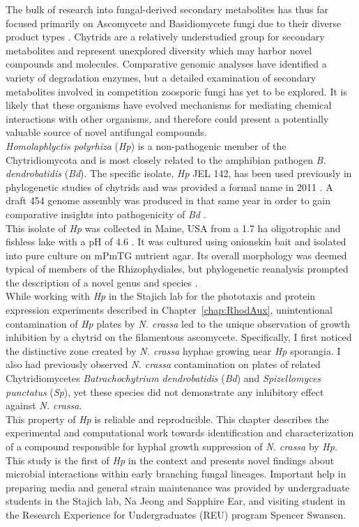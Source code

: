 \indent The bulk of research into fungal-derived secondary metabolites has thus far focused primarily on Ascomycete and Basidiomycete fungi due to their diverse product types \cite{Berdy2012}. Chytrids are a relatively understudied group for secondary metabolites and represent unexplored diversity which may harbor novel compounds and molecules. Comparative genomic analyses have identified a variety of degradation enzymes, but a detailed examination of secondary metabolites involved in competition zoosporic fungi has yet to be explored. It is likely that these organisms have evolved mechanisms for mediating chemical interactions with other organisms, and therefore could present a potentially valuable source of novel antifungal compounds.\\
\indent \textit{Homolaphlyctis polyrhiza} (\textit{Hp}) is a non-pathogenic member of the Chytridiomycota and is most closely related to the amphibian pathogen \textit{B. dendrobatidis} (\textit{Bd}). The specific isolate, \textit{Hp} JEL 142, has been used previously in phylogenetic studies of chytrids \cite{James2000,James2006sixGene,Letcher2008} and was provided a formal name in 2011 \cite{Longcore2011}. A draft 454 genome assembly was produced in that same year in order to gain comparative insights into pathogenicity of \textit{Bd} \cite{Joneson2011}.\\
\indent This isolate of \textit{Hp} was collected in Maine, USA from a 1.7 ha oligotrophic and fishless lake with a pH of 4.6 \cite{Davis1994,Rhodes1995}. It was cultured using onionskin bait and isolated into pure culture on mPmTG nutrient agar. Its overall morphology was deemed typical of members of the Rhizophydiales, but phylogenetic reanalysis prompted the description of a novel genus and species \cite{Longcore2011}.\\
\indent While working with \textit{Hp} in the Stajich lab for the phototaxis and protein expression experiments described in Chapter~\ref{chap:RhodAux}, unintentional contamination of \textit{Hp} plates by \textit{N. crassa} led to the unique observation of growth inhibition by a chytrid on the filamentous ascomycete. Specifically, I first noticed the distinctive zone created by \textit{N. crassa} hyphae growing near \textit{Hp} sporangia. I also had previously observed \textit{N. crassa} contamination on plates of related Chytridiomycetes \textit{Batrachochytrium dendrobatidis} (\textit{Bd}) and \textit{Spizellomyces punctatus} (\textit{Sp}), yet these species did not demonstrate any inhibitory effect against \textit{N. crassa}.\\
\indent This property of \textit{Hp} is reliable and reproducible. This chapter describes the experimental and computational work towards identification and characterization of a compound responsible for hyphal growth suppression of \textit{N. crassa} by \textit{Hp}. This study is the first of \textit{Hp} in the context and presents novel findings about microbial interactions within early branching fungal lineages. Important help in preparing media and general strain maintenance was provided by undergraduate students in the Stajich lab, Na Jeong and Sapphire Ear, and visiting student in the Research Experience for Undergraduates (REU) program Spencer Swansen.\\

